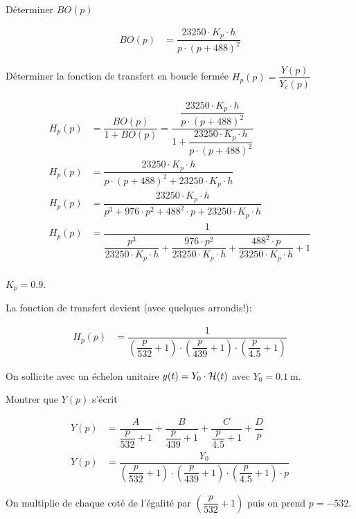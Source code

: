 \begin{Exo}[name={Devoir},title={Système de pendulation},origin={Adapté de Centrale MP 2000},label={exo:CentralePendulation}]
\begin{Cor}
\begin{multicols}{2}
{\par
}


\qst Déterminer $BO(p)$


\begin{align*}
BO(p)&= \dfrac{23250 \cdot K_p \cdot h }{p\cdot(p+488)^2}
\end{align*}

\qst Déterminer la fonction de transfert en boucle fermée $H_p(p)=\dfrac{Y(p)}{Y_c(p)}$

\begin{align*}
H_p(p)&=\dfrac{BO(p)}{1+BO(p)}= \dfrac{\dfrac{23250 \cdot K_p \cdot h }{p\cdot(p+488)^2}}{1+\dfrac{23250 \cdot K_p \cdot h }{p\cdot(p+488)^2}}\\
H_p(p)&= \dfrac{23250 \cdot K_p \cdot h }{p\cdot(p+488)^2+23250 \cdot K_p \cdot h }\\
H_p(p)&= \dfrac{23250 \cdot K_p \cdot h }{p^3+976\cdot p^2 +488^2\cdot p+23250 \cdot K_p \cdot h }\\
H_p(p)&= \dfrac{1}{\dfrac{p^3}{23250 \cdot K_p \cdot h }+\dfrac{976\cdot p^2}{23250 \cdot K_p \cdot h } +\dfrac{488^2\cdot p}{23250 \cdot K_p \cdot h }+1}\\
\end{align*}

 $K_p=\num{0.9}$.


La fonction de transfert devient (avec quelques arrondis!):

\begin{align*}
H_p(p)&=\dfrac{1}{\left(\dfrac{p}{532}+1\right)\cdot \left(\dfrac{p}{439}+1\right)\cdot\left (\dfrac{p}{4.5}+1\right)}
\end{align*}

On sollicite avec un échelon unitaire $y(t)=Y_0\cdot \mathcal {H}(t)$  avec $Y_0=\SI{0.1}{\metre}$.

\qst Montrer que $Y(p)$  s'écrit 

\begin{align*}
Y(p)&= \dfrac{A}{\dfrac{p}{532}+1}+\dfrac{B}{\dfrac{p}{439}+1}+ \dfrac{C}{\dfrac{p}{4.5}+1} +\dfrac{D}{p}\\
Y(p)&=\dfrac{Y_0}{\left(\dfrac{p}{532}+1\right)\cdot \left(\dfrac{p}{439}+1\right)\cdot\left (\dfrac{p}{4.5}+1\right)\cdot p}
\end{align*}

On multiplie de chaque coté de l'égalité par $\left(\dfrac{p}{532}+1\right)$  puis on prend $p=-532$.


\end{multicols}
\end{Cor}
\end{Exo}
